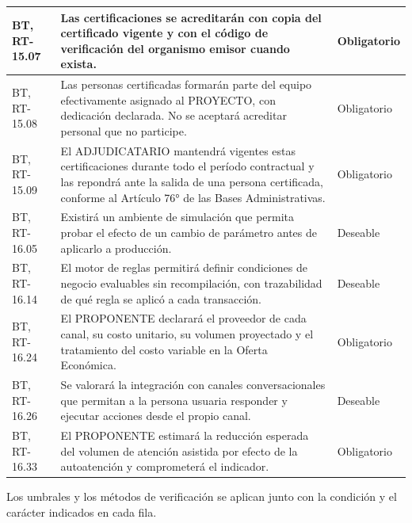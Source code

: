 \begin{longtable}{|L{0.098425\AnchoTablaAnexo}|L{0.814961\AnchoTablaAnexo}|L{0.086614\AnchoTablaAnexo}|}
BT, RT-15.07 &
Las certificaciones se acreditarán con copia del certificado vigente y con el código de verificación del organismo emisor cuando exista. &
Obligatorio \\ \hline
BT, RT-15.08 &
Las personas certificadas formarán parte del equipo efectivamente asignado al PROYECTO, con dedicación declarada. No se aceptará acreditar personal que no participe. &
Obligatorio \\ \hline
{}
BT, RT-15.09 &
El ADJUDICATARIO mantendrá vigentes estas certificaciones durante todo el período contractual y las repondrá ante la salida de una persona certificada, conforme al Artículo 76° de las Bases Administrativas. &
Obligatorio \\ \hline
BT, RT-16.05 &
Existirá un ambiente de simulación que permita probar el efecto de un cambio de parámetro antes de aplicarlo a producción. &
Deseable \\ \hline
{}
BT, RT-16.14 &
El motor de reglas permitirá definir condiciones de negocio evaluables sin recompilación, con trazabilidad de qué regla se aplicó a cada transacción. &
Deseable \\ \hline
BT, RT-16.24 &
El PROPONENTE declarará el proveedor de cada canal, su costo unitario, su volumen proyectado y el tratamiento del costo variable en la Oferta Económica. &
Obligatorio \\ \hline
{}
BT, RT-16.26 &
Se valorará la integración con canales conversacionales que permitan a la persona usuaria responder y ejecutar acciones desde el propio canal. &
Deseable \\ \hline
BT, RT-16.33 &
El PROPONENTE estimará la reducción esperada del volumen de atención asistida por efecto de la autoatención y comprometerá el indicador. &
Obligatorio \\ \hline
\end{longtable}

Los umbrales y los métodos de verificación se aplican junto con la condición y el carácter indicados en cada fila.
